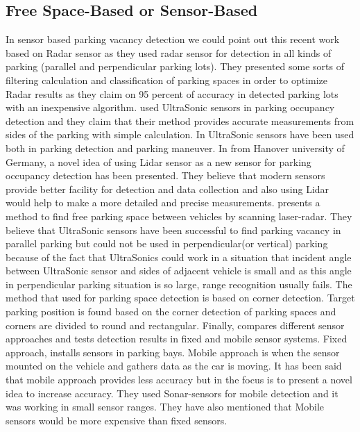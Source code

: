 \subsection{Free Space-Based or Sensor-Based}
In sensor based parking vacancy detection we could point out this recent work \cite{radar-parkingDetection} based on Radar sensor as they used radar sensor for detection in all kinds of parking (parallel and perpendicular parking lots). They presented some sorts of filtering calculation and classification of parking spaces in order to optimize Radar results as they claim on 95 percent of accuracy in detected parking lots with an inexpensive algorithm. \cite{UltraSonic} used UltraSonic sensors in parking occupancy detection and they claim that their method provides accurate measurements from sides of the parking with simple calculation. In \cite{detection-ultraSonic} UltraSonic sensors have been used both in parking detection and parking maneuver. In \cite{lidar-Germany} from Hanover university of Germany, a novel idea of using Lidar sensor as a new sensor for parking occupancy detection has been presented. They believe that modern sensors provide better facility for detection and data collection and also using Lidar would help to make a more detailed and precise measurements. \cite{Laser-radar-based} presents a method to find free parking space between vehicles by scanning laser-radar. They believe that UltraSonic sensors have been successful to find parking vacancy in parallel parking but could not be used in perpendicular(or vertical) parking because of the fact that UltraSonics could work in a situation that incident angle between UltraSonic sensor and sides of adjacent vehicle is small and as this angle in perpendicular parking situation is so large, range recognition usually fails. The method that \cite{Laser-radar-based} used for parking space detection is based on corner detection. Target parking position is found based on the corner detection of parking spaces and corners are divided to round and rectangular. Finally,\cite{fixed-mobile-sensors} compares different sensor approaches and tests detection results in fixed and mobile sensor systems. Fixed approach, installs sensors in parking bays. Mobile approach is when the sensor mounted on the vehicle and gathers data as the car is moving. It has been said that mobile approach provides less accuracy but in \cite{fixed-mobile-sensors} the focus is to present a novel idea to increase accuracy. They used Sonar-sensors for mobile detection and it was working in small sensor ranges. They have also mentioned that Mobile sensors would be more expensive than fixed sensors.
